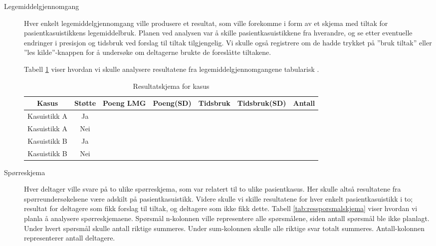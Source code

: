 \begin{description}
\item[Legemiddelgjennomgang]
Hver enkelt legemiddelgjennomgang ville produsere et resultat, som ville forekomme i form av et skjema med tiltak for pasientkasuistikkens legemiddelbruk. Planen ved analysen var å skille pasientkasuistikkene fra hverandre, og se etter eventuelle endringer i presisjon og tidsbruk ved forslag til tiltak tilgjengelig. Vi skulle også registrere om de hadde trykket på ''bruk tiltak'' eller ''les kilde''-knappen for å undersøke om deltagerne brukte de foreslåtte tiltakene.

Tabell \ref{tab:resskjema} viser hvordan vi skulle analysere resultatene fra legemiddelgjennomgangene tabularisk .

\begin{table}[H]
    \centering
    \begin{tabular}{ |c|c|c|c|c|c| c|} 
 \hline
 \textbf{Kasus} & \textbf{Støtte} & \textbf{Poeng LMG} & \textbf{Poeng(SD)} & \textbf{Tidsbruk} & \textbf{Tidsbruk(SD)} & Antall\\
 \hline
 Kasuistikk A & Ja &  &  &  &  & \\ 
 \hline
 Kasuistikk A & Nei &  &  &  &  & \\
 \hline
 Kasuistikk B & Ja &  &  &  &  & \\
 \hline
 Kasuistikk B & Nei &  &  &  &  & \\
 \hline
\end{tabular}
\caption{Resultatskjema for kasus}
\label{tab:resskjema}
\end{table}


\item[Spørreskjema]
Hver deltager ville svare på to ulike spørreskjema, som var relatert til to ulike pasientkasus. Her skulle altså resultatene fra spørreundersøkelsene være adskilt på pasientkasuistikk. Videre skulle vi skille resultatene for hver enkelt pasientkasuistikk i to; resultat for deltagere som fikk forslag til tiltak, og deltagere som ikke fikk dette. Tabell \ref{tab:ressporsmalskjema} viser hvordan vi planla å analysere spørreskjemaene. Spørsmål n-kolonnen ville representere alle spørsmålene, siden antall spørsmål ble ikke planlagt. Under hvert spørsmål skulle antall riktige summeres. Under sum-kolonnen skulle alle riktige svar totalt summeres. Antall-kolonnen representerer antall deltagere.


\end{description}
